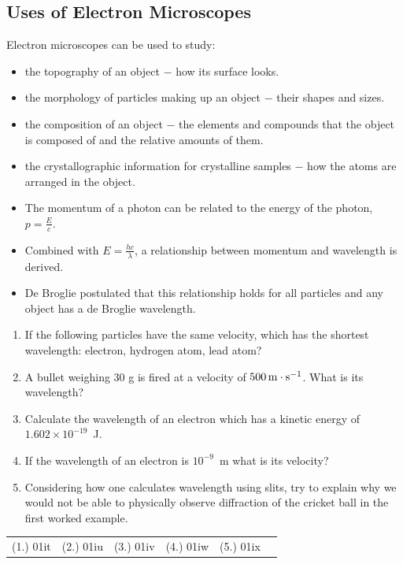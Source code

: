 \subsection{Uses of Electron Microscopes}
Electron microscopes can be used to study:
\begin{itemize}
\item the topography of an object $-$ how its surface looks.
\item the morphology of particles making up an object  $-$ their shapes and sizes.
\item the composition of an object $-$ the elements and compounds that the object is composed of and the relative amounts of them.
\item the crystallographic information for crystalline samples $-$ how the atoms are arranged in the object.
\end{itemize}

\clearpage

\begin{itemize}
\item The momentum of a photon can be related to the energy of the photon, $p=\frac{E}{c}$.
\item Combined with $E=\frac{hc}{\lambda}$, a relationship between momentum and wavelength is derived.
\item De Broglie postulated that this relationship holds for all particles and any object has a de Broglie wavelength.
\end{itemize}


\begin{eocexercises}{}
\begin{enumerate}
  \item If the following particles have the same velocity, which has the shortest wavelength: electron, hydrogen atom, lead atom? 
\item A bullet weighing 30 g is fired at a velocity of $500\,\mathrm{m \cdot s^{-1}}$. What is its wavelength?
\item Calculate the wavelength of an electron which has a kinetic energy of $1.602\times10^{-19}$~J.
\item If the wavelength of an electron is $10^{-9}$~m what is its velocity?
\item Considering how one calculates wavelength using slits, try to explain why we would not be able to physically observe diffraction of the cricket ball in the first worked example.
 \end{enumerate}
\par \practiceinfo
\par \begin{tabular}[h]{cccccc}
(1.)	01it	&
(2.)	01iu	&
(3.)	01iv	&
(4.)	01iw	&
(5.)	01ix	&
\end{tabular}
\end{eocexercises}






